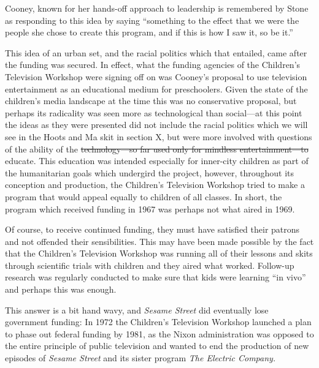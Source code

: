 \documentclass[12pt,letterpaper]{article}
\newcommand{\ses}{\textit{Sesame Street }}
\providecommand{\DIFadd}[1]{{\protect\color{blue}\uwave{#1}}} %
\providecommand{\DIFdel}[1]{{\protect\color{red}\sout{#1}}}                      %
\providecommand{\DIFaddbegin}{} %
\providecommand{\DIFaddend}{} %
\providecommand{\DIFdelbegin}{} %
\providecommand{\DIFdelend}{} %
\newcommand{\DIFscaledelfig}{0.5}
\newlength{\DIFdelgraphicswidth} %
\newlength{\DIFdelgraphicsheight} %
\newcommand{\DIFaddincludegraphics}[2][]{{\color{blue}\fbox{\DIFOincludegraphics[#1]{#2}}}} %
\newcommand{\DIFdelincludegraphics}[2][]{%
\sbox{\DIFdelgraphicsbox}{\DIFOincludegraphics[#1]{#2}}%
\settoboxwidth{\DIFdelgraphicswidth}{\DIFdelgraphicsbox} %
\settoboxtotalheight{\DIFdelgraphicsheight}{\DIFdelgraphicsbox} %
\scalebox{\DIFscaledelfig}{%
\parbox[b]{\DIFdelgraphicswidth}{\usebox{\DIFdelgraphicsbox}\\[-\baselineskip] \rule{\DIFdelgraphicswidth}{0em}}\llap{\resizebox{\DIFdelgraphicswidth}{\DIFdelgraphicsheight}{%
\setlength{\unitlength}{\DIFdelgraphicswidth}%
\begin{picture}(1,1)%
\thicklines\linethickness{2pt} %
{\color[rgb]{1,0,0}\put(0,0){\framebox(1,1){}}}%
{\color[rgb]{1,0,0}\put(0,0){\line( 1,1){1}}}%
{\color[rgb]{1,0,0}\put(0,1){\line(1,-1){1}}}%
\end{picture}%
}\hspace*{3pt}}} %
} %
\DeclareRobustCommand{\DIFaddbegin}{\DIFOaddbegin \let\includegraphics\DIFaddincludegraphics} %
\DeclareRobustCommand{\DIFaddend}{\DIFOaddend \let\includegraphics\DIFOincludegraphics} %
\DeclareRobustCommand{\DIFdelbegin}{\DIFOdelbegin \let\includegraphics\DIFdelincludegraphics} %
\DeclareRobustCommand{\DIFdelend}{\DIFOaddend \let\includegraphics\DIFOincludegraphics} %
\begin{document}
	Cooney, known for her hands-off approach to leadership is remembered by
	Stone as responding to this idea by saying ``something to the effect 
	that we were the people she chose to create this program, and if this is
	how I saw it, so be it.'' \autocite[155]{Davis} 

	This idea of an urban set, and the racial politics which that 
	entailed, came after the funding was secured. In effect, what the 
	funding agencies of the Children’s Television Workshop were signing off
	on was Cooney’s proposal to use television entertainment as an 
	educational medium for preschoolers. Given the state of the children’s 
	media landscape at the time \autocite[chapters 1, 3, and 4]{Davis} this 
	was no conservative proposal, but perhaps its radicality was seen more 
	as technological than social---at this point the ideas as they were 
	presented did not include the racial politics which we will see in 
	the Hoots and Ma skit in section X, but were more involved with 
	questions of the ability of the \DIFdelbegin \DIFdel{technology---so far used only for 
	mindless entertainment---to }\DIFdelend \DIFaddbegin \DIFadd{technology to }\DIFaddend educate. This education 
	was intended 
	especially for inner-city children as part of the humanitarian goals 
	which undergird the project, however, throughout its conception and 
	production, the Children's Television Workshop tried to make a program 
	that would appeal equally to children of all classes. In short, the 
	program which received funding in 1967 was perhaps not what aired in 
	1969.

	Of course, to receive continued funding, they must have satisfied their 
	patrons and not offended their sensibilities. This may have been made 
	possible by the fact that the Children's Television Workshop  was
	running all of their lessons and skits through scientific trials with 
	children and they aired what worked. Follow-up research was regularly 
	conducted to make sure that kids were learning ``in 
	vivo''\autocite[118]{Davis} and perhaps	this was enough.

	This answer is a bit hand wavy, and \ses did eventually lose government
	funding: In 1972 the Children's Television Workshop launched a plan to 
	phase out federal funding by 1981, as the Nixon administration was 
	opposed to the entire principle of public television and wanted to end 
	the production of new episodes of \ses and its sister program
	\textit{The Electric Company.}\autocite[218]{Davis} 
\end{document}
